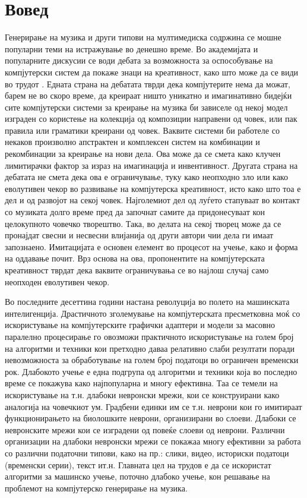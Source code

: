 \newpage
\chapter{Вовед}

Генерирање на музика и други типови на мултимедиска содржина се мошне популарни теми на истражување во денешно време. Во академијата и популарните дискусии се води дебата за возможноста за оспособување на компјутерски систем да покаже знаци на креативност, како што може да се види во трудот \cite{Ghedini2015}. Едната страна на дебатата тврди дека компјутерите нема да можат, барем не во скоро време, да креираат ништо уникатно и имагинативно бидејќи сите компјутерски системи за креирање на музика би зависеле од некој модел изграден со користење на колекција од композиции направени од човек, или пак правила или граматики креирани од човек. Ваквите системи би работеле со некаков произволно апстрактен и комплексен систем на комбинации и рекомбинации за креирање на нови дела. Ова може да се смета како клучен лимитирачки фактор за израз на имагинација и инвентивност. Другата страна на дебатата не смета дека ова е ограничување, туку како неопходно зло или како еволутивен чекор во развивање на компјутерска креативност, исто како што тоа е дел и од развојот на секој човек. Најголемиот дел од луѓето стапуваат во контакт со музиката долго време пред да започнат самите да придонесуваат кон целокупното човечко творештво. Така, во делата на секој творец може да се пронајдат свесни и несвесни влијанија од други автори чии дела ги имаат запознаено. Имитацијата е основен елемент во процесот на учење, како и форма на оддавање почит. Врз основа на ова, пропонентите на компјутерската креативност тврдат дека ваквите ограничувања се во најлош случај само неопходен еволутивен чекор.

Во последните десеттина години настана револуција во полето на машинската интелигенција. Драстичното зголемување на компјутерската пресметковна моќ со искористување на компјутерските графички адаптери и модели за масовно паралелно процесирање го овозможи практичното искористување на голем број на алгоритми и техники кои претходно даваа релативно слаби резултати поради невозможноста за обработување на голем број податоци во ограничен временски рок. Длабокото учење е една подгрупа од алгоритми и техники која во последно време се покажува како најпопуларна и многу ефективна. Таа се темели на искористување на т.н. длабоки невронски мрежи, кои се конструирани како аналогија на човечкиот ум. Градбени единки им се т.н. неврони кои го имитираат функционирањето на биолошките неврони, организирани во слоеви. Длабоки се невронските мрежи кои се изградени од повеќе слоеви од неврони. Различни организации на длабоки невронски мрежи се покажаа многу ефективни за работа со различни податочни типови, како на пр.: слики, видео, историски податоци (временски серии), текст ит.н. Главната цел на трудов е да се искористат алгоритми за машинско учење, поточно длабоко учење, кон решавање на проблемот на компјутерско генерирање на музика.

